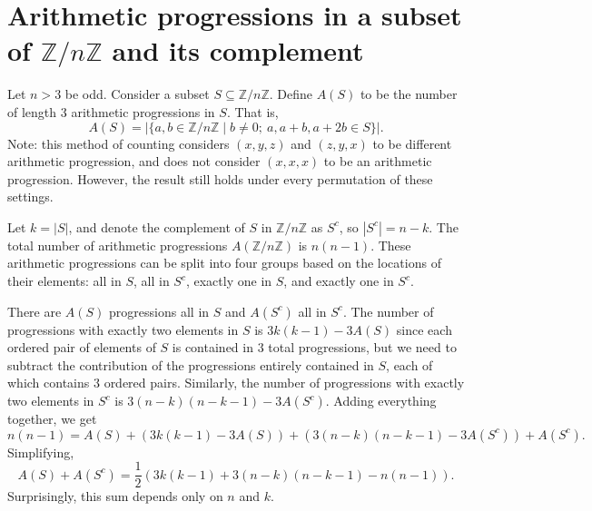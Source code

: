 \documentclass{article}
\newcommand{\p}[1]{\left(#1\right)}
\newcommand{\f}[2]{\frac{#1}{#2}}
\newcommand{\abs}[1]{\left\lvert#1\right\rvert}
\newcommand{\Z}{\mathbb{Z}}
\begin{document}
	\section*{Arithmetic progressions in a subset of $\Z/n\Z$ and its complement}

	Let $n > 3$ be odd. Consider a subset $S \subseteq \Z/n\Z$. Define $A(S)$ to be the number of length 3 arithmetic progressions in $S$. That is,
	\[ A(S) = \abs{\{a, b \in \Z/n\Z \mid b \neq 0;\ a, a + b, a + 2b \in S \}}. \]
	Note: this method of counting considers $(x, y, z)$ and $(z, y, x)$ to be different arithmetic progression, and does not consider $(x, x, x)$ to be an arithmetic progression. However, the result still holds under every permutation of these settings.

	Let $k = \abs{S}$, and denote the complement of $S$ in $\Z/n\Z$ as $S^c$, so $\abs{S^c} = n - k$. The total number of arithmetic progressions $A(\Z/n\Z)$ is $n(n-1)$. These arithmetic progressions can be split into four groups based on the locations of their elements: all in $S$, all in $S^c$, exactly one in $S$, and exactly one in $S^c$.

	There are $A(S)$ progressions all in $S$ and $A(S^c)$ all in $S^c$. The number of progressions with exactly two elements in $S$ is $3k(k-1) - 3A(S)$ since each ordered pair of elements of $S$ is contained in $3$ total progressions, but we need to subtract the contribution of the progressions entirely contained in $S$, each of which contains $3$ ordered pairs. Similarly, the number of progressions with exactly two elements in $S^c$ is $3(n-k)(n-k-1) - 3A(S^c)$. Adding everything together, we get
	\[ n(n-1) = A(S) + (3k(k-1) - 3A(S)) + (3(n-k)(n-k-1) - 3A(S^c)) + A(S^c). \]
	Simplifying,
	\[ A(S) + A(S^c) = \f{1}{2}\p{3k(k-1) + 3(n-k)(n-k-1) - n(n-1)}. \]
	Surprisingly, this sum depends only on $n$ and $k$.
\end{document}
